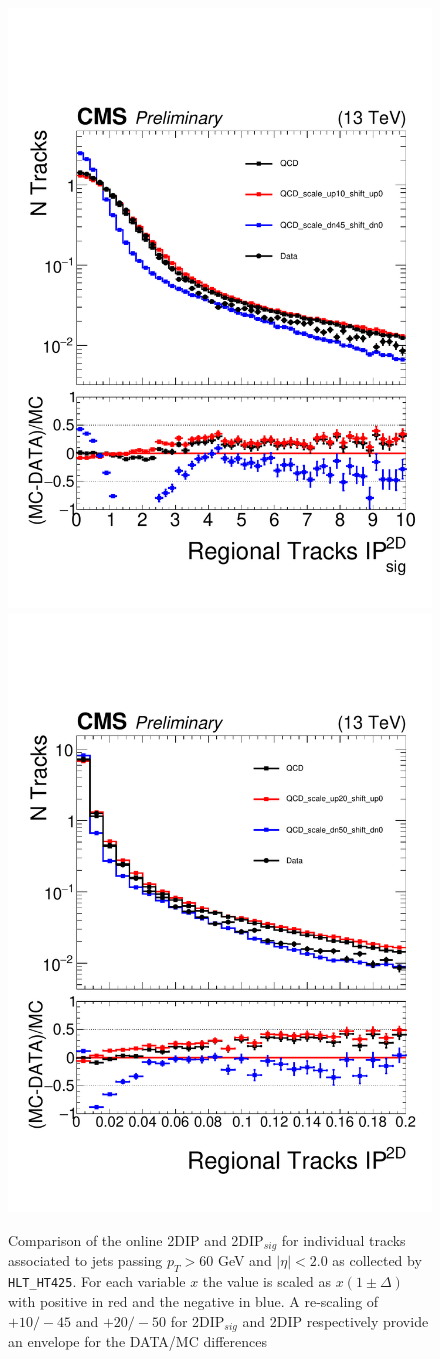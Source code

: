 \begin{figure}
\begin{center}
\includegraphics[width=.45\textwidth]{figures/an/SYSTEMATICS/REGIONAL_SYSTEMATIC/2dipsig_regional_systematic.pdf}
\includegraphics[width=.45\textwidth]{figures/an/SYSTEMATICS/REGIONAL_SYSTEMATIC/2dip_regional_systematic.pdf}
\caption{Comparison of the online 2DIP and 2DIP$_{sig}$ for individual tracks associated to jets passing $p_{T} > 60$ GeV and $|\eta| <2.0$ as collected by  \texttt{HLT\_HT425}. For each variable $x$ the value is scaled as $x(1\pm\Delta)$ with positive in red and the negative in blue. A re-scaling of $+10/-45$ and $+20/-50$ for
2DIP$_{sig}$ and 2DIP respectively provide an envelope for the DATA/MC differences  \label{fig:regional_modeling}}
\end{center}
\end{figure}

